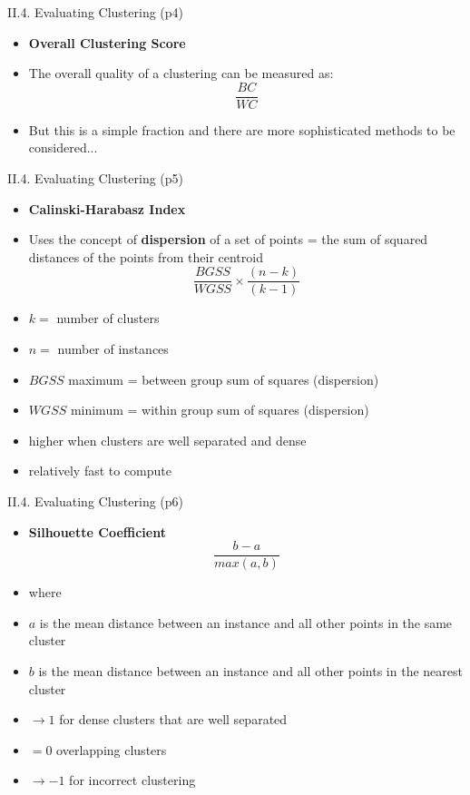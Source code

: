 \documentclass[handout]{beamer}
\newcommand{\strong}[1]{\textbf{\color{teal} #1}}
\newcommand{\stronger}[1]{\textbf{\color{purple} #1}}
\begin{document}
\begin{frame}{II.4. Evaluating Clustering (p4)}
\begin{itemize}
\item \stronger{Overall Clustering Score}
\item The overall quality of a clustering can be measured as:
\[
	\frac{BC}{WC}
\]
\item But this is a simple fraction and there are more sophisticated methods to be considered...
\end{itemize}
\end{frame}
\begin{frame}{II.4. Evaluating Clustering (p5)}
\begin{itemize}
\item \stronger{Calinski-Harabasz Index}
\item Uses the concept of \strong{dispersion} of a set of points = the sum of squared distances of the points from their centroid
\[
	\frac{BGSS}{WGSS} \times \frac{ ( n-k ) }{ ( k - 1 ) }
\]
\item $k =$ number of clusters
\item $n =$ number of instances
\item $BGSS$ maximum = between group sum of squares (dispersion)
\item $WGSS$ minimum = within group sum of squares (dispersion)
\item higher when clusters are well separated and dense
\item relatively fast to compute
\end{itemize}
\end{frame}
\begin{frame}{II.4. Evaluating Clustering (p6)}
\begin{itemize}
\item \stronger{Silhouette Coefficient}
\[
	\frac{ b - a }{ max(a,b) }
\]
\item[] where
\item $a$ is the mean distance between an instance and all other points in the same cluster
\item $b$ is the mean distance between an instance and all other points in the nearest cluster
\item $\rightarrow 1$ for dense clusters that are well separated
\item $= 0$ overlapping clusters
\item $\rightarrow -1$ for incorrect clustering 
\end{itemize}
\end{frame}
\end{document}
